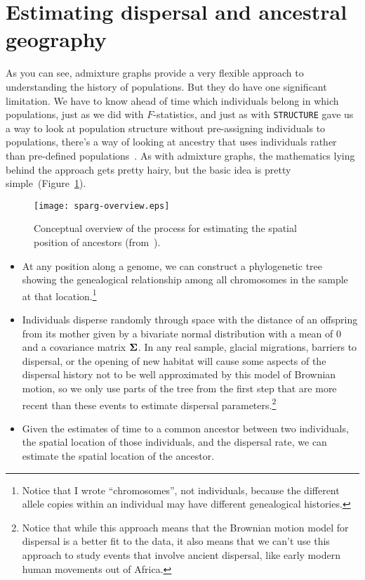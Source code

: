 \section*{Estimating dispersal and ancestral
  geography}

As you can see, admixture graphs provide a very flexible approach to
understanding the history of populations. But they do have one
significant limitation. We have to know ahead of time which
individuals belong in which populations, just as we did with
$F$-statistics, and just as with
{\tt STRUCTURE} gave us a way to look at population structure without
pre-assigning individuals to populations, there's a way of looking at
ancestry that uses individuals rather than pre-defined
populations~\cite{Osmond-Coop-2021}. As with admixture graphs, the
mathematics lying behind the approach gets pretty hairy, but the basic
idea is pretty simple~(Figure~\ref{fig:sparg-overview}).

\begin{figure}
  \begin{center}
    \texttt{[image: sparg-overview.eps]}
  \end{center}
  \caption{Conceptual overview of the process for estimating the
    spatial position of ancestors
    (from~\cite{Osmond-Coop-2021}).}\label{fig:sparg-overview} 
\end{figure}

\begin{itemize}

  \item At any position along a genome, we can construct a
    phylogenetic tree showing the genealogical relationship among all
    chromosomes in the sample at that location.\footnote{Notice that I
      wrote ``chromosomes'', not individuals, because the different
      allele copies within an individual may have different
      genealogical histories.} 

  \item Individuals disperse randomly through space with the distance
    of an offspring from its mother given by a bivariate normal
    distribution with a mean of 0 and a covariance matrix
    $\bf\Sigma$. In any real sample, glacial migrations,
    barriers to dispersal, or the opening of new habitat will cause
    some aspects of the dispersal history not to be well approximated
    by this model of Brownian motion, so we only use parts of the tree
    from the first step that are more recent than these events to
    estimate dispersal parameters.\footnote{Notice that while this
      approach means that the Brownian motion model for dispersal is a
      better fit to the data, it also means that we can't use this
      approach to study events that involve ancient dispersal, like
      early modern human movements out of Africa.}

  \item Given the estimates of time to a common ancestor between two
    individuals, the spatial location of those individuals, and the
    dispersal rate, we can estimate the spatial location of the
    ancestor. 

\end{itemize}


